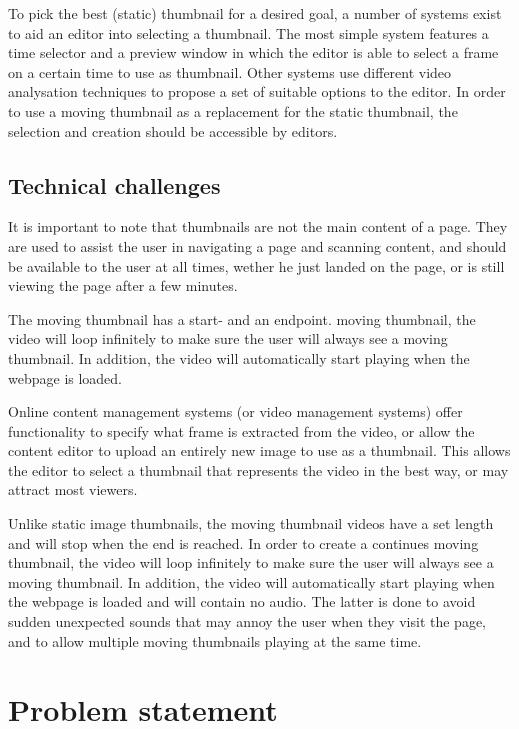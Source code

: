 \documentclass{../resources/acm_proc_article-sp}
\begin{document}
To pick the best (static) thumbnail for a desired goal, a number of systems exist to aid an editor into selecting a thumbnail. The most simple system features a time selector and a preview window in which the editor is able to select a frame on a certain time to use as thumbnail. Other systems use different video analysation techniques to propose a set of suitable options to the editor. In order to use a moving thumbnail as a replacement for the static thumbnail, the selection and creation should be accessible by editors.


\subsection{Technical challenges}

It is important to note that thumbnails are not the main content of a page. They are used to assist the user in navigating a page and scanning content, and should be available to the user at all times, wether he just landed on the page, or is still viewing the page after a few minutes.


The moving thumbnail has a start- and an endpoint. moving thumbnail, the video will loop infinitely to make sure the user will always see a moving thumbnail. In addition, the video will automatically start playing when the webpage is loaded.

Online content management systems (or video management systems) offer functionality to specify what frame is extracted from the video, or allow the content editor to upload an entirely new image to use as a thumbnail. This allows the editor to select a thumbnail that represents the video in the best way, or may attract most viewers.



Unlike static image thumbnails, the moving thumbnail videos have a set length and will stop when the end is reached. In order to create a continues moving thumbnail, the video will loop infinitely to make sure the user will always see a moving thumbnail. In addition, the video will automatically start playing when the webpage is loaded and will contain no audio. The latter is done to avoid sudden unexpected sounds that may annoy the user when they visit the page, and to allow multiple moving thumbnails playing at the same time. 

\section{Problem statement}
\end{document}
